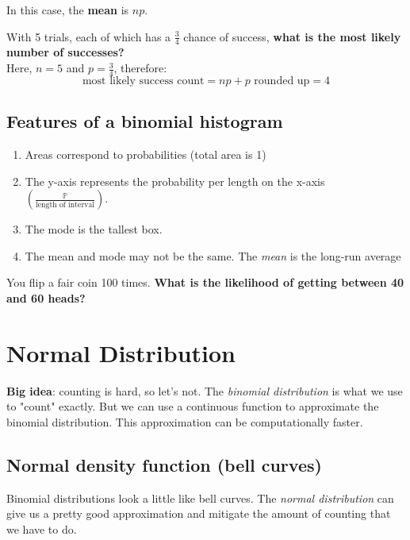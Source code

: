 \documentclass[titlepage, 12pt, leqno]{article}
\begin{document}
\begin{note}
    In this case, the \textbf{mean} is $np$.
\end{note}

\begin{ex}
    With 5 trials, each of which has a $\frac{3}{4}$ chance of success, \textbf{what is the most likely number of successes?} \\[.1in]
    Here, $n=5$ and $p=\frac{3}{4}$, therefore:
    \[
    \boxed{\text{most likely success count} = np+p \text{ rounded up}= 4}
    \]
\end{ex}

\subsection{Features of a binomial histogram}
\begin{enumerate}
    \item Areas correspond to probabilities (total area is 1) 
    \item The y-axis represents the probability per length on the x-axis $\left(\frac{\mathbb{P}}{\text{length of interval}}\right)$.
    \item The mode is the tallest box.
    \item The mean and mode may not be the same. The \textit{mean} is the long-run average
\end{enumerate}

\begin{ex}
    You flip a fair coin 100 times. \textbf{What is the likelihood of getting between 40 and 60 heads?} 
\end{ex}

\pagebreak
\section{Normal Distribution}
\textbf{Big idea}: counting is hard, so let's not. The \textit{binomial distribution} is what we use to "count" exactly. But we can use a continuous function to approximate the binomial distribution. This approximation can be computationally faster.

\subsection{Normal density function (bell curves)}
Binomial distributions look a little like bell curves. The \textit{normal distribution} can give us a pretty good approximation and mitigate the amount of counting that we have to do.
\end{document}
